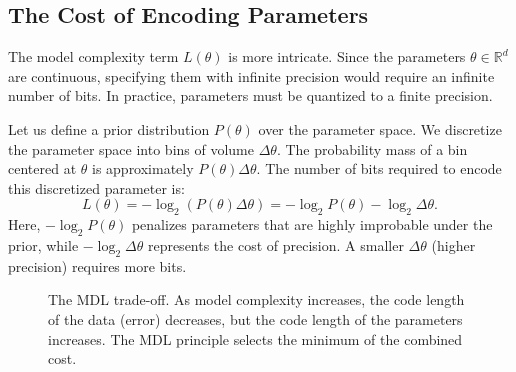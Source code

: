\subsection{The Cost of Encoding Parameters}

The model complexity term $L(\theta)$ is more intricate. Since the parameters $\theta \in \mathbb{R}^d$ are continuous, specifying them with infinite precision would require an infinite number of bits. In practice, parameters must be quantized to a finite precision. 

Let us define a prior distribution $P(\theta)$ over the parameter space. We discretize the parameter space into bins of volume $\Delta \theta$. The probability mass of a bin centered at $\theta$ is approximately $P(\theta) \Delta \theta$. The number of bits required to encode this discretized parameter is:
\begin{equation}
    L(\theta) = -\log_2 \left( P(\theta) \Delta \theta \right) = -\log_2 P(\theta) - \log_2 \Delta \theta.
\end{equation}
Here, $- \log_2 P(\theta)$ penalizes parameters that are highly improbable under the prior, while $- \log_2 \Delta \theta$ represents the cost of precision. A smaller $\Delta \theta$ (higher precision) requires more bits. 

\begin{figure}[htbp]
\centering
{}
\caption{The MDL trade-off. As model complexity increases, the code length of the data (error) decreases, but the code length of the parameters increases. The MDL principle selects the minimum of the combined cost.}
\label{fig:mdl_tradeoff}
\end{figure}

